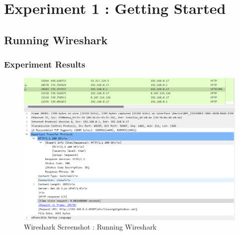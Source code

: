 \section{Experiment 1 : Getting Started}
\subsection{Running Wireshark}
    \subsubsection*{Experiment Results}
    \vspace{-4mm}
        \begin{figure}[!h]\centering
        	\includegraphics[width=.8\textwidth]{image/week01/1-1.png}
        	\caption{Wireshark Screenshot : Running Wireshark}
        \end{figure}
